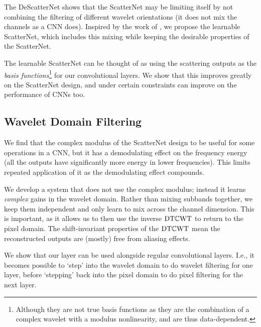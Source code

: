 The DeScatterNet shows that the ScatterNet may be limiting itself by not
combining the filtering of different wavelet orientations (it does not mix the
channels as a CNN does). Inspired by the work of \cite{qiu_dcfnet:_2018}, we
propose the learnable ScatterNet, which includes this mixing while keeping the 
desirable properties of the ScatterNet. 

The learnable ScatterNet can be thought of as using the scattering outputs as
the \emph{basis functions}\footnote{Although they are not true basis functions
as they are the combination of a complex wavelet with a modulus nonlinearity,
and are thus data-dependent.} for our convolutional layers. We show that this
improves greatly on the ScatterNet design, and under certain constraints can
improve on the performance of CNNs too.

\subsection{Wavelet Domain Filtering}
We find that the complex modulus of the ScatterNet design to be useful for some
operations in a CNN, but it has a demodulating effect on the frequency energy
(all the outputs have significantly more energy in lower frequencies). This
limits repeated application of it as the demodulating effect compounds.

We develop a system that does not use the complex modulus; instead it 
learns \emph{complex} gains in the wavelet domain. 
Rather than mixing subbands together, we keep them independent and only learn to
mix across the channel dimension. This is important, as it allows us to then use the inverse
$\mathrm{DT}\mathbb{C}\mathrm{WT}$ to return to the pixel domain. The shift-invariant properties of the $\mathrm{DT}\mathbb{C}\mathrm{WT}$ mean the
reconstructed outputs are (mostly) free from aliasing effects.

We show that our layer can be used alongside regular convolutional
layers. I.e., it becomes possible to `step' into the wavelet domain to do
wavelet filtering for one layer, before `stepping' back into the pixel domain to 
do pixel filtering for the next layer. 

